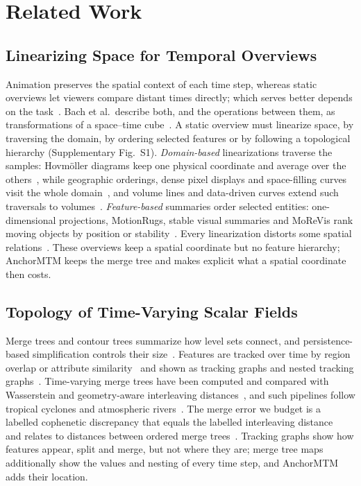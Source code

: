 \section{Related Work}\label{sec:related}
\subsection{Linearizing Space for Temporal Overviews}
Animation preserves the spatial context of each time step, whereas static overviews let viewers compare distant times directly; which serves better depends on the task~\cite{Tversky:2002:Animation,Robertson:2008:Animation}. Bach et al.\ describe both, and the operations between them, as transformations of a space--time cube~\cite{Bach:2017:STC}. A static overview must linearize space, by traversing the domain, by ordering selected features or by following a topological hierarchy (Supplementary Fig.~S1). \emph{Domain-based} linearizations traverse the samples: Hovm\"oller diagrams keep one physical coordinate and average over the others~\cite{Hovmoller:1949}, while geographic orderings, dense pixel displays and space-filling curves visit the whole domain~\cite{Guo:2006:SpatialOrder,Dafner:2000:CSFC,Rauscher:2025:1DO}, and volume lines and data-driven curves extend such traversals to volumes~\cite{Weissenboeck:2019:DVL,Zhou:2021:DSF}. \emph{Feature-based} summaries order selected entities: one-dimensional projections, MotionRugs, stable visual summaries and MoReVis rank moving objects by position or stability~\cite{Franke:2021:1DP,Buchmueller:2019:MR,Wulms:2021:SVS,Valdrighi:2024:MRV}. Every linearization distorts some spatial relations~\cite{Nonato:2019:MP,Aupetit:2007:VD}. These overviews keep a spatial coordinate but no feature hierarchy; AnchorMTM keeps the merge tree and makes explicit what a spatial coordinate then costs.

\subsection{Topology of Time-Varying Scalar Fields}
Merge trees and contour trees summarize how level sets connect, and persistence-based simplification controls their size~\cite{Heine:2016:Survey,Edelsbrunner:2002:TPS,Tierny:2018:TTK}. Features are tracked over time by region overlap or attribute similarity~\cite{Silver:1997:Tracking,Saikia:2017:GFT} and shown as tracking graphs and nested tracking graphs~\cite{Widanagamaachchi:2012:DTG,Lukasczyk:2017:NTG,Lukasczyk:2020:DNTG}. Time-varying merge trees have been computed and compared with Wasserstein and geometry-aware interleaving distances~\cite{Oesterling:2017:TVMT,Pont:2022:WMT,Yan:2022:GAMT,Yan:2021:Survey}, and such pipelines follow tropical cyclones and atmospheric rivers~\cite{Yan:2024:TROPHY,Lan:2024:AR}. The merge error we budget is a labelled cophenetic discrepancy that equals the labelled interleaving distance~\cite{Munch:2019:LINF,Gasparovic:2024:IID,Morozov:2013:IDMT} and relates to distances between ordered merge trees~\cite{Beurskens:2025:OMT}. Tracking graphs show how features appear, split and merge, but not where they are; merge tree maps additionally show the values and nesting of every time step, and AnchorMTM adds their location.

